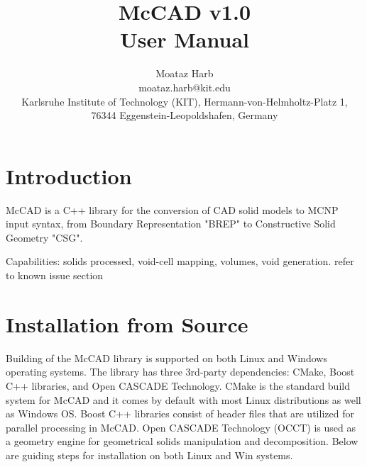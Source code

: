 \documentclass[letterpaper, 12 pt]{report}
\begin{document}
\title{McCAD v1.0 \\ User Manual}
\author{Moataz Harb \\ moataz.harb@kit.edu \\ Karlsruhe Institute of Technology (KIT), Hermann-von-Helmholtz-Platz 1, \\ 76344 Eggenstein-Leopoldshafen, Germany}
\maketitle
\pagestyle{empty}

\tableofcontents
\newpage

\section{Introduction}
McCAD is a C++ library for the conversion of CAD solid models to MCNP input syntax, from Boundary Representation "BREP" to Constructive Solid Geometry "CSG".

Capabilities: solids processed, void-cell mapping, volumes, void generation.
refer to known issue section

\section{Installation from Source}
Building of the McCAD library is supported on both Linux and Windows operating systems. The library has three 3rd-party dependencies: CMake, Boost C++ libraries, and Open CASCADE Technology. CMake is the standard build system for McCAD and it comes by default with most Linux distributions as well as Windows OS. Boost C++ libraries consist of header files that are utilized for parallel processing in McCAD. Open CASCADE Technology (OCCT) is used as a geometry engine for geometrical solids manipulation and decomposition. Below are guiding steps for installation on both Linux and Win systems. 
\end{document}
